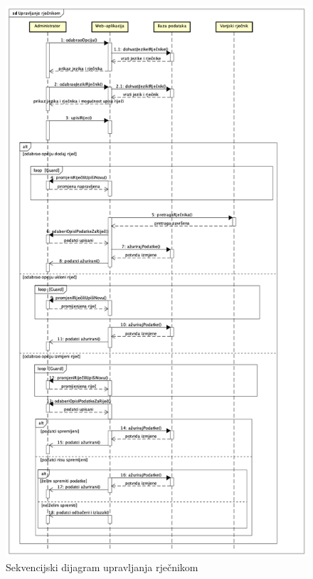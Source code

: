 					\begin{figure}[H]
						\includegraphics[width=\textwidth]{dijagrami/sdiag2.png}
						\caption{Sekvencijski dijagram upravljanja rječnikom}
						\label{fig:sdiag2}
					\end{figure}

				\eject	


